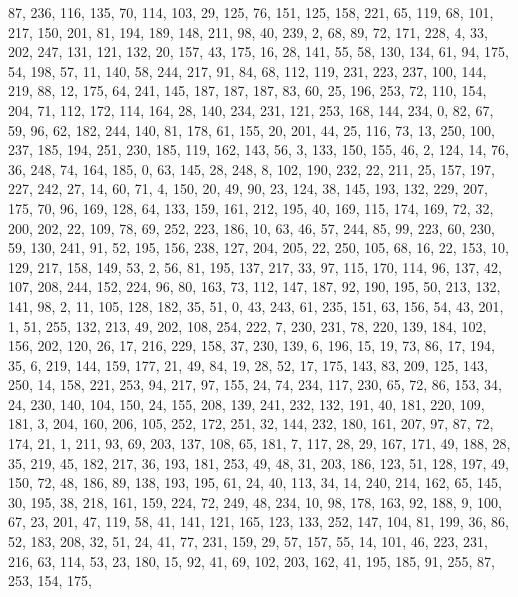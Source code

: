 \begin{DoxyCode}
       87, 236, 116, 135, 70, 114, 103, 29, 125, 76, 151, 125, 158, 221, 65, 119, 68, 101, 217, 150, 201, 81, 194,
       189, 148, 211, 98, 40, 239, 2, 68, 89, 72, 171, 228, 4, 33, 202, 247, 131, 121, 132, 20, 157, 43, 175, 16,
       28, 141, 55, 58, 130, 134, 61, 94, 175, 54, 198, 57, 11, 140, 58, 244, 217, 91, 84, 68, 112, 119, 231, 223,
       237, 100, 144, 219, 88, 12, 175, 64, 241, 145, 187, 187, 187, 83, 60, 25, 196, 253, 72, 110, 154, 204, 71,
       112, 172, 114, 164, 28, 140, 234, 231, 121, 253, 168, 144, 234, 0, 82, 67, 59, 96, 62, 182, 244, 140, 81, 178,
       61, 155, 20, 201, 44, 25, 116, 73, 13, 250, 100, 237, 185, 194, 251, 230, 185, 119, 162, 143, 56, 3, 133,
       150, 155, 46, 2, 124, 14, 76, 36, 248, 74, 164, 185, 0, 63, 145, 28, 248, 8, 102, 190, 232, 22, 211, 25, 157,
       197, 227, 242, 27, 14, 60, 71, 4, 150, 20, 49, 90, 23, 124, 38, 145, 193, 132, 229, 207, 175, 70, 96, 169,
       128, 64, 133, 159, 161, 212, 195, 40, 169, 115, 174, 169, 72, 32, 200, 202, 22, 109, 78, 69, 252, 223, 186,
       10, 63, 46, 57, 244, 85, 99, 223, 60, 230, 59, 130, 241, 91, 52, 195, 156, 238, 127, 204, 205, 22, 250, 105,
       68, 16, 22, 153, 10, 129, 217, 158, 149, 53, 2, 56, 81, 195, 137, 217, 33, 97, 115, 170, 114, 96, 137, 42,
       107, 208, 244, 152, 224, 96, 80, 163, 73, 112, 147, 187, 92, 190, 195, 50, 213, 132, 141, 98, 2, 11, 105,
       128, 182, 35, 51, 0, 43, 243, 61, 235, 151, 63, 156, 54, 43, 201, 1, 51, 255, 132, 213, 49, 202, 108, 254,
       222, 7, 230, 231, 78, 220, 139, 184, 102, 156, 202, 120, 26, 17, 216, 229, 158, 37, 230, 139, 6, 196, 15, 19,
       73, 86, 17, 194, 35, 6, 219, 144, 159, 177, 21, 49, 84, 19, 28, 52, 17, 175, 143, 83, 209, 125, 143, 250, 14,
       158, 221, 253, 94, 217, 97, 155, 24, 74, 234, 117, 230, 65, 72, 86, 153, 34, 24, 230, 140, 104, 150, 24,
       155, 208, 139, 241, 232, 132, 191, 40, 181, 220, 109, 181, 3, 204, 160, 206, 105, 252, 172, 251, 32, 144, 232,
       180, 161, 207, 97, 87, 72, 174, 21, 1, 211, 93, 69, 203, 137, 108, 65, 181, 7, 117, 28, 29, 167, 171, 49,
       188, 28, 35, 219, 45, 182, 217, 36, 193, 181, 253, 49, 48, 31, 203, 186, 123, 51, 128, 197, 49, 150, 72, 48,
       186, 89, 138, 193, 195, 61, 24, 40, 113, 34, 14, 240, 214, 162, 65, 145, 30, 195, 38, 218, 161, 159, 224,
       72, 249, 48, 234, 10, 98, 178, 163, 92, 188, 9, 100, 67, 23, 201, 47, 119, 58, 41, 141, 121, 165, 123, 133,
       252, 147, 104, 81, 199, 36, 86, 52, 183, 208, 32, 51, 24, 41, 77, 231, 159, 29, 57, 157, 55, 14, 101, 46, 223,
       231, 216, 63, 114, 53, 23, 180, 15, 92, 41, 69, 102, 203, 162, 41, 195, 185, 91, 255, 87, 253, 154, 175,

\end{DoxyCode}
